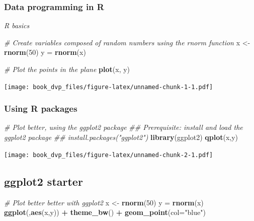 \documentclass[
]{book}
\newenvironment{Shaded}{\begin{snugshade}}{\end{snugshade}}
\newcommand{\CommentTok}[1]{\textcolor[rgb]{0.56,0.35,0.01}{\textit{#1}}}
\newcommand{\DataTypeTok}[1]{\textcolor[rgb]{0.13,0.29,0.53}{#1}}
\newcommand{\DecValTok}[1]{\textcolor[rgb]{0.00,0.00,0.81}{#1}}
\newcommand{\KeywordTok}[1]{\textcolor[rgb]{0.13,0.29,0.53}{\textbf{#1}}}
\newcommand{\NormalTok}[1]{#1}
\newcommand{\OperatorTok}[1]{\textcolor[rgb]{0.81,0.36,0.00}{\textbf{#1}}}
\newcommand{\StringTok}[1]{\textcolor[rgb]{0.31,0.60,0.02}{#1}}
\begin{document}
\hypertarget{data-programming-in-r}{%
\subsubsection{Data programming in R}\label{data-programming-in-r}}

\emph{R basics}

\begin{Shaded}
\begin{Highlighting}[]
\CommentTok{# Create variables composed of random numbers using the rnorm function}
\NormalTok{x <-}\KeywordTok{rnorm}\NormalTok{(}\DecValTok{50}\NormalTok{) }
\NormalTok{y =}\StringTok{ }\KeywordTok{rnorm}\NormalTok{(x)}

\CommentTok{# Plot the points in the plane }
\KeywordTok{plot}\NormalTok{(x, y)}
\end{Highlighting}
\end{Shaded}

\texttt{[image: book\_dvp\_files/figure-latex/unnamed-chunk-1-1.pdf]}

\hypertarget{using-r-packages}{%
\subsubsection{Using R packages}\label{using-r-packages}}

\begin{Shaded}
\begin{Highlighting}[]
\CommentTok{# Plot better, using the ggplot2 package }
\CommentTok{## Prerequisite: install and load the ggplot2 package}
\CommentTok{## install.packages("ggplot2")}
\KeywordTok{library}\NormalTok{(ggplot2)}
\KeywordTok{qplot}\NormalTok{(x,y)}
\end{Highlighting}
\end{Shaded}

\texttt{[image: book\_dvp\_files/figure-latex/unnamed-chunk-2-1.pdf]}

\hypertarget{ggplot2-starter}{%
\subsection{ggplot2 starter}\label{ggplot2-starter}}

\begin{Shaded}
\begin{Highlighting}[]
\CommentTok{# Plot better better with ggplot2}
\NormalTok{x <-}\StringTok{ }\KeywordTok{rnorm}\NormalTok{(}\DecValTok{50}\NormalTok{) }
\NormalTok{y =}\StringTok{ }\KeywordTok{rnorm}\NormalTok{(x)}
\KeywordTok{ggplot}\NormalTok{(,}\KeywordTok{aes}\NormalTok{(x,y)) }\OperatorTok{+}\StringTok{ }\KeywordTok{theme_bw}\NormalTok{() }\OperatorTok{+}\StringTok{ }\KeywordTok{geom_point}\NormalTok{(}\DataTypeTok{col=}\StringTok{"blue"}\NormalTok{)}
\end{Highlighting}
\end{Shaded}
\end{document}
